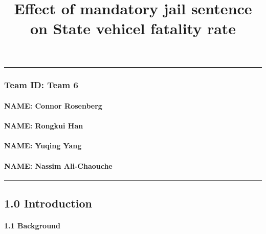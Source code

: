 \documentclass[]{article}
\title{Effect of mandatory jail sentence on State vehicel fatality rate}
\author{}
\date{\vspace{-2.5em}}
\let\oldparagraph\paragraph
\renewcommand{\paragraph}[1]{\oldparagraph{#1}\mbox{}}
\begin{document}
\maketitle

\begin{center}\rule{0.5\linewidth}{0.5pt}\end{center}

\hypertarget{team-id-team-6}{%
\subsubsection{Team ID: Team 6}\label{team-id-team-6}}

\hypertarget{name-connor-rosenberg}{%
\paragraph{NAME: Connor Rosenberg}\label{name-connor-rosenberg}}

\hypertarget{name-rongkui-han}{%
\paragraph{NAME: Rongkui Han}\label{name-rongkui-han}}

\hypertarget{name-yuqing-yang}{%
\paragraph{NAME: Yuqing Yang}\label{name-yuqing-yang}}

\hypertarget{name-nassim-ali-chaouche}{%
\paragraph{NAME: Nassim Ali-Chaouche}\label{name-nassim-ali-chaouche}}

\begin{center}\rule{0.5\linewidth}{0.5pt}\end{center}

\hypertarget{introduction}{%
\subsection{1.0 Introduction}\label{introduction}}

\hypertarget{background}{%
\paragraph{1.1 Background}\label{background}}
\end{document}
